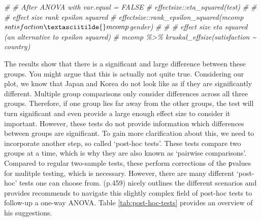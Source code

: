 \documentclass[
]{book}
\newenvironment{Shaded}{\begin{snugshade}}{\end{snugshade}}
\newcommand{\CommentTok}[1]{\textcolor[rgb]{0.56,0.35,0.01}{\textit{#1}}}
\begin{document}
\begin{Shaded}
\begin{Highlighting}[]
\CommentTok{\# \# After ANOVA with var.equal = FALSE}
\CommentTok{\# effectsize::eta\_squared(test)}
\CommentTok{\# }
\CommentTok{\# \# effect size rank epsilon squared}
\CommentTok{\# effectsize::rank\_epsilon\_squared(mcomp$satisfaction \textasciitilde{} mcomp$gender)}
\CommentTok{\# }
\CommentTok{\# \# effect size eta squared (an alternative to epsilon squared)}
\CommentTok{\# mcomp \%\textgreater{}\% kruskal\_effsize(satisfaction \textasciitilde{} country)}
\end{Highlighting}
\end{Shaded}

The results show that there is a significant and large difference between these groups. You might argue that this is actually not quite true. Considering our plot, we know that Japan and Korea do not look like as if they are significantly different. Multiple group comparisons only consider differences across all three groups. Therefore, if one group lies far away from the other groups, the test will turn significant and even provide a large enough effect size to consider it important. However, these tests do not provide information which differences between groups are significant. To gain more clarification about this, we need to incorporate another step, so called `post-hoc tests'. These tests compare two groups at a time, which is why they are also known as `pairwise comparisons'. Compared to regular two-sample tests, these perform corrections of the \texttt{p}values for mulitple testing, which is necessary. However, there are many different `post-hoc' tests one can choose from. \citet{field2013discovering} (p.459) nicely outlines the different scenarios and provides recommends to navigate this slightly complex field of post-hoc tests to follow-up a one-way ANOVA. Table \ref{tab:post-hoc-tests} provides an overview of his suggestions.
\end{document}
